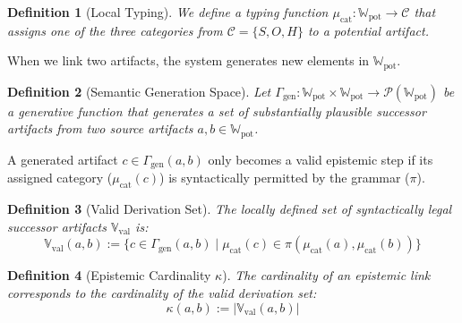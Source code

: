 \documentclass[11pt, a4paper]{article}
\newtheorem{definition}{Definition}
\begin{document}
	\begin{definition}[Local Typing]
		We define a typing function $\mu_{\text{cat}}: \mathbb{W}_{\text{pot}} \to \mathcal{C}$ that assigns one of the three categories from $\mathcal{C} = \{S, O, H\}$ to a potential artifact.
	\end{definition}
	
	When we link two artifacts, the system generates new elements in $\mathbb{W}_{\text{pot}}$.
	
	\begin{definition}[Semantic Generation Space]
		Let $\Gamma_{\text{gen}}: \mathbb{W}_{\text{pot}} \times \mathbb{W}_{\text{pot}} \to \mathcal{P}(\mathbb{W}_{\text{pot}})$ be a generative function that generates a set of substantially plausible successor artifacts from two source artifacts $a, b \in \mathbb{W}_{\text{pot}}$.
	\end{definition}
	
	A generated artifact $c \in \Gamma_{\text{gen}}(a,b)$ only becomes a valid epistemic step if its assigned category ($\mu_{\text{cat}}(c)$) is syntactically permitted by the grammar ($\pi$).
	
	\begin{definition}[Valid Derivation Set]
		The locally defined set of syntactically legal successor artifacts $\mathbb{V}_{\text{val}}$ is:
		\[
		\mathbb{V}_{\text{val}}(a, b) := \{ c \in \Gamma_{\text{gen}}(a, b) \mid \mu_{\text{cat}}(c) \in \pi(\mu_{\text{cat}}(a), \mu_{\text{cat}}(b)) \}
		\]
	\end{definition}
	
	\begin{definition}[Epistemic Cardinality $\kappa$]
		The cardinality of an epistemic link corresponds to the cardinality of the valid derivation set:
		\[
		\kappa(a, b) := |\mathbb{V}_{\text{val}}(a, b)|
		\]
	\end{definition}
	
\end{document}
